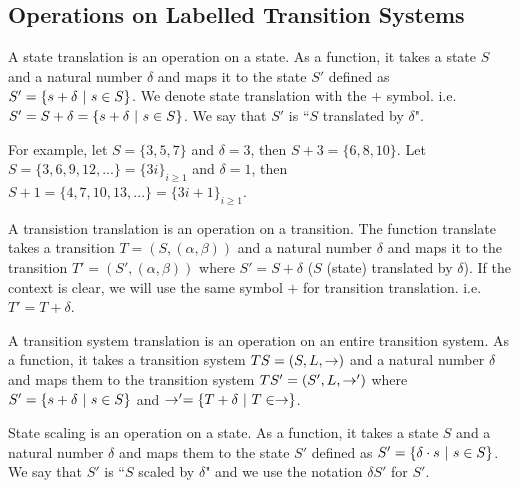 \documentclass[runningheads,a4paper]{llncs}
\begin{document}

\subsection{Operations on Labelled Transition Systems}

\begin{definition}
A state translation is an operation on a state. As a function, it takes a state $S$ and a natural
number $\delta$ and maps it to the state $S'$ defined as $S' = \{s + \delta\text{ }|\text{ } s \in S\}$. We
denote state translation with the $+$ symbol. i.e. $S' = S+\delta = \{s + \delta\text{ }|\text{ } s \in S\}$.
We say that $S'$ is ``$S$ translated by $\delta$".
\end{definition}

For example, let $S=\{3,5,7\}$ and $\delta = 3$, then $S+3 = \{6,8,10\}$. Let $S = \{3,6,9,12,...\}
= \{3i\}_{i\geq 1}$ and $\delta = 1$, then $S+1 = \{4,7,10,13,...\}=\{3i+1\}_{i\geq 1}$.

\begin{definition}
A transistion translation is an operation on a transition. The function translate takes a transition
$T = (S,(\alpha,\beta))$ and a natural number $\delta$ and maps it to the transition 
$T' = (S',(\alpha,\beta))$ where $S'=S+\delta$ ($S$ (state) translated by $\delta$). If the context
is clear, we will use the same symbol $+$ for transition translation. i.e. $T' = T +\delta$.
\end{definition}


\begin{definition}
A transition system translation is an operation on an entire transition system. As a function, it
takes a transition system $TS=(S,L,\rightarrow)$ and a natural number $\delta$ and maps them to the 
transition system $TS'=(S',L,\rightarrow')$ where $S'=\{s+\delta\text{ }|\text{ } s \in S\}$ and $\rightarrow' = \{T+\delta
\text{ }|\text{ } T \in \rightarrow\}$.
\end{definition}

\begin{definition}
State scaling is an operation on a state. As a function, it takes a state $S$ and a natural number
$\delta$ and maps them to the state $S'$ defined as $S' = \{\delta \cdot s\text{ }|\text{ } s\in S\}$. We say
that $S'$ is ``$S$ scaled by $\delta$" and we use the notation $\delta S'$ for $S'$.
\end{definition}
\end{document}
